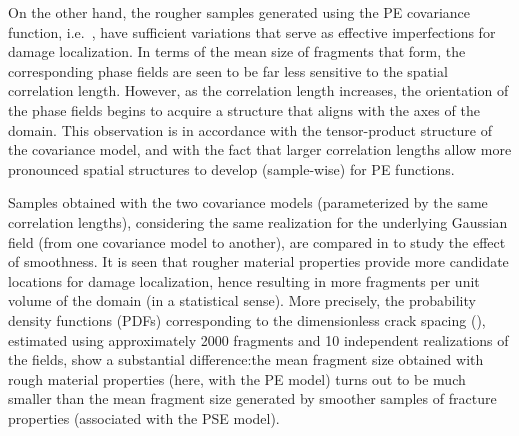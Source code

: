 On the other hand, the rougher samples generated using the PE covariance function, i.e.\ , have sufficient variations that serve as effective imperfections for damage localization. In terms of the mean size of fragments that form, the corresponding phase fields are seen to be far less sensitive to the spatial correlation length.  However, as the correlation length increases, the orientation of the phase fields begins to acquire a structure that aligns with the axes of the domain. This observation is in accordance with the tensor-product structure of the covariance model, and with the fact that larger correlation lengths allow more pronounced spatial structures to develop (sample-wise) for PE functions.

Samples obtained with the two covariance models (parameterized by the same correlation lengths), considering the same realization for the underlying Gaussian field (from one covariance model to another), are compared in  to study the effect of smoothness. It is seen that rougher material properties provide more candidate locations for damage localization, hence resulting in more fragments per unit volume of the domain (in a statistical sense). More precisely, the probability density functions (PDFs) corresponding to the dimensionless crack spacing (), estimated using approximately 2000 fragments and 10 independent realizations of the fields, show a substantial difference:the mean fragment size obtained with rough material properties (here, with the PE model) turns out to be much smaller than the mean fragment size generated by smoother samples of fracture properties (associated with the PSE model).









